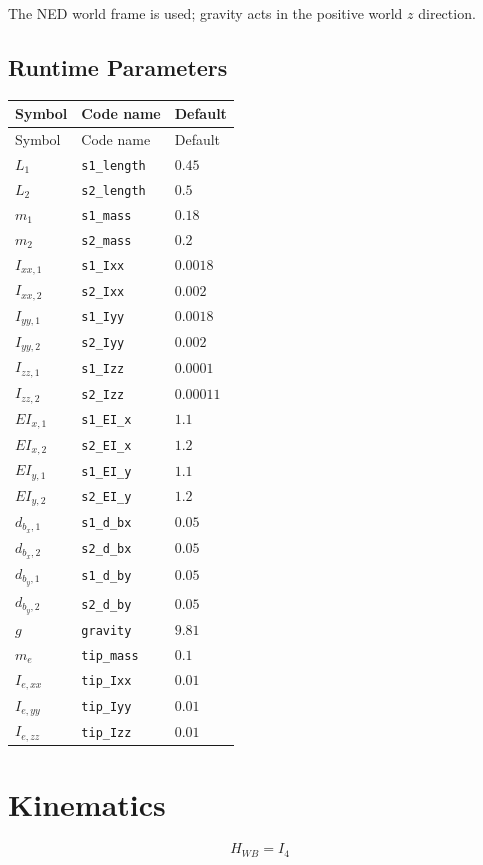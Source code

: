 \documentclass[11pt]{article}
\begin{document}
The NED world frame is used; gravity acts in the positive world $z$ direction.
\subsection{Runtime Parameters}
\begin{longtable}{lll}
\hline
Symbol & Code name & Default \\
\hline
\endfirsthead
\hline Symbol & Code name & Default \\
\hline
\endhead
$L_{1}$ & \texttt{s1\_length} & $0.45$ \\
$L_{2}$ & \texttt{s2\_length} & $0.5$ \\
$m_{1}$ & \texttt{s1\_mass} & $0.18$ \\
$m_{2}$ & \texttt{s2\_mass} & $0.2$ \\
$I_{xx,1}$ & \texttt{s1\_Ixx} & $0.0018$ \\
$I_{xx,2}$ & \texttt{s2\_Ixx} & $0.002$ \\
$I_{yy,1}$ & \texttt{s1\_Iyy} & $0.0018$ \\
$I_{yy,2}$ & \texttt{s2\_Iyy} & $0.002$ \\
$I_{zz,1}$ & \texttt{s1\_Izz} & $0.0001$ \\
$I_{zz,2}$ & \texttt{s2\_Izz} & $0.00011$ \\
$EI_{x,1}$ & \texttt{s1\_EI\_x} & $1.1$ \\
$EI_{x,2}$ & \texttt{s2\_EI\_x} & $1.2$ \\
$EI_{y,1}$ & \texttt{s1\_EI\_y} & $1.1$ \\
$EI_{y,2}$ & \texttt{s2\_EI\_y} & $1.2$ \\
$d_{b_x,1}$ & \texttt{s1\_d\_bx} & $0.05$ \\
$d_{b_x,2}$ & \texttt{s2\_d\_bx} & $0.05$ \\
$d_{b_y,1}$ & \texttt{s1\_d\_by} & $0.05$ \\
$d_{b_y,2}$ & \texttt{s2\_d\_by} & $0.05$ \\
$g$ & \texttt{gravity} & $9.81$ \\
$m_e$ & \texttt{tip\_mass} & $0.1$ \\
$I_{e,xx}$ & \texttt{tip\_Ixx} & $0.01$ \\
$I_{e,yy}$ & \texttt{tip\_Iyy} & $0.01$ \\
$I_{e,zz}$ & \texttt{tip\_Izz} & $0.01$ \\
\hline
\end{longtable}

\section{Kinematics}
\begin{equation}
H_{WB}=I_4
\end{equation}
\end{document}
